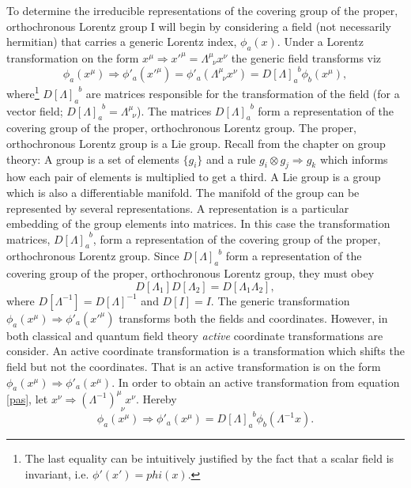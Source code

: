 To determine the irreducible representations of the covering group of the proper, orthochronous Lorentz group I will begin by considering a field (not necessarily hermitian) that carries a generic Lorentz index, $\phi_a(x)$. Under a Lorentz transformation on the form $x^\mu\Rightarrow {x'}^\mu=\Lambda^\mu_{\,\,\, \nu}x^\nu$ the generic field transforms viz
\begin{equation}
	\phi_a(x^\mu)\Rightarrow \phi'_a({x'}^\mu)=\phi'_a(\Lambda^\mu_{\,\,\, \nu}x^\nu)=D[\Lambda]_{a}^{\,\,\, b}\phi_b(x^\mu),
	\label{pas}
\end{equation} 
where\footnote{The last equality can be intuitively justified by the fact that a scalar field is invariant, i.e. $\phi'(x')=phi(x)$.} $D[\Lambda]_{a}^{\,\,\, b}$ are matrices responsible for the transformation of the field (for a vector field; $D[\Lambda]_{a}^{\,\,\, b}=\Lambda^\mu_{\,\,\, \nu}$). The matrices $D[\Lambda]_{a}^{\,\,\, b}$ form a representation of the covering group of the proper, orthochronous Lorentz group. The proper, orthochronous Lorentz group is a Lie group. Recall from the chapter on group theory: A group is a set of elements $\{g_i\}$ and a rule $g_i\otimes g_j\Rightarrow g_k$ which informs how each pair of elements is multiplied to get a third. A Lie group is a group which is also a differentiable manifold. The manifold of the group can be represented by several representations. A representation is a particular embedding of the group elements into matrices. In this case the transformation matrices, $D[\Lambda]_{a}^{\,\,\, b}$, form a representation of the covering group of the proper, orthochronous Lorentz group. Since $D[\Lambda]_{a}^{\,\,\, b}$ form a representation of the covering group of the proper, orthochronous Lorentz group, they must obey
\begin{equation}
	D[\Lambda_1]D[\Lambda_2]=D[\Lambda_1\Lambda_2],
\end{equation}  
where $D[\Lambda^{-1}]=D[\Lambda]^{-1}$ and $D[I]=I$. The generic transformation $\phi_a(x^\mu)\Rightarrow \phi'_a({x'}^\mu)$ transforms both the fields and coordinates. However, in both classical and quantum field theory \emph{active} coordinate transformations are consider. An active coordinate transformation is a transformation which shifts the field but not the coordinates. That is an active transformation is on the form $\phi_a(x^\mu)\Rightarrow \phi'_a({x}^\mu)$. In order to obtain an active transformation from equation \eqref{pas}, let  $x^\nu\Rightarrow (\Lambda^{-1})^\mu_{\,\,\,\nu}x^\nu$. Hereby
\begin{equation}
	\phi_a(x^\mu)\Rightarrow \phi'_a(x^\mu)=D[\Lambda]_{a}^{\,\,\, b}\phi_b(\Lambda^{-1}x).
	\label{act}
\end{equation} 
